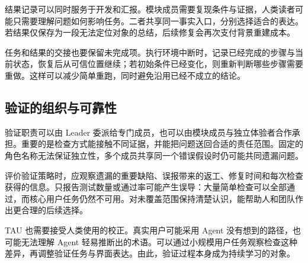 结果记录可以同时服务于开发和汇报。模块成员需要复现条件与证据，人类读者可能只需要理解问题如何影响任务。二者共享同一事实入口，分别选择适合的表达。若结果仅保存为一段无法定位对象的总结，后续修复会再次支付背景重建成本。

任务和结果的交接也要保留未完成项。执行环境中断时，记录已经完成的步骤与当前状态，恢复后从可信位置继续；若初始条件已经变化，则重新判断哪些步骤需要重做。这样可以减少简单重跑，同时避免沿用已经不成立的结论。

\subsection{验证的组织与可靠性}
验证职责可以由 Leader 委派给专门成员，也可以由模块成员与独立体验者合作承担。重要的是检查方式能接触不同证据，并能把问题送回合适的责任范围。固定的角色名称无法保证独立性，多个成员共享同一个错误假设时仍可能共同遗漏问题。

评价验证策略时，应观察遗漏的重要缺陷、误报带来的返工、修复时间和每次检查获得的信息。只报告测试数量或通过率可能产生误导：大量简单检查可以全部通过，而核心用户任务仍然不可用。对未覆盖范围保持清楚认识，能帮助人和团队作出更合理的后续选择。

TAU 也需要接受人类使用的校正。真实用户可能采用 Agent 没有想到的路径，也可能无法理解 Agent 轻易推断出的术语。可以通过小规模用户任务观察检查这种差异，再调整验证任务与界面表达。由此，验证过程本身成为持续学习的对象。
